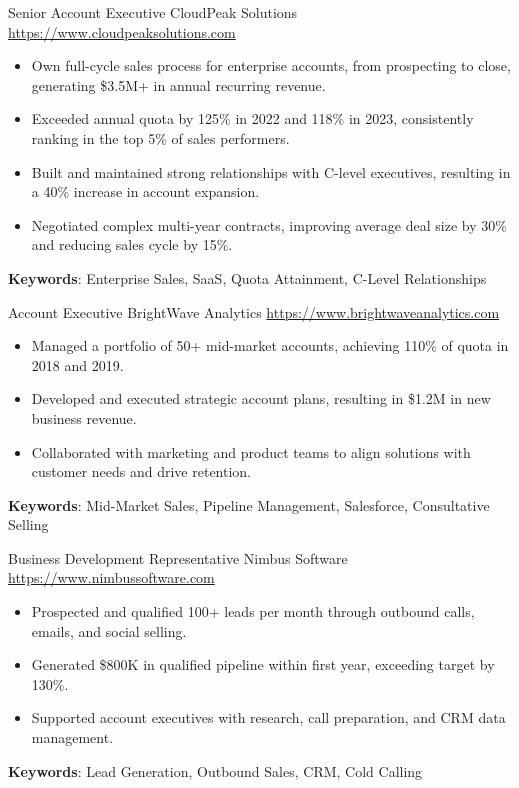 \documentclass[a4paper, serif, 10pt]{moderncv}
\begin{document}
        {Senior Account Executive}
        {CloudPeak Solutions}
        {\url{https://www.cloudpeaksolutions.com}}
        {}
        {\begin{itemize}
\item Own full-cycle sales process for enterprise accounts, from prospecting to close, generating \$3.5M+ in annual recurring revenue.
\item Exceeded annual quota by 125\% in 2022 and 118\% in 2023, consistently ranking in the top 5\% of sales performers.
\item Built and maintained strong relationships with C-level executives, resulting in a 40\% increase in account expansion.
\item Negotiated complex multi-year contracts, improving average deal size by 30\% and reducing sales cycle by 15\%.
\end{itemize}
\textbf{Keywords}: Enterprise Sales, SaaS, Quota Attainment, C-Level Relationships}

        {Account Executive}
        {BrightWave Analytics}
        {\url{https://www.brightwaveanalytics.com}}
        {}
        {\begin{itemize}
\item Managed a portfolio of 50+ mid-market accounts, achieving 110\% of quota in 2018 and 2019.
\item Developed and executed strategic account plans, resulting in \$1.2M in new business revenue.
\item Collaborated with marketing and product teams to align solutions with customer needs and drive retention.
\end{itemize}
\textbf{Keywords}: Mid-Market Sales, Pipeline Management, Salesforce, Consultative Selling}

        {Business Development Representative}
        {Nimbus Software}
        {\url{https://www.nimbussoftware.com}}
        {}
        {\begin{itemize}
\item Prospected and qualified 100+ leads per month through outbound calls, emails, and social selling.
\item Generated \$800K in qualified pipeline within first year, exceeding target by 130\%.
\item Supported account executives with research, call preparation, and CRM data management.
\end{itemize}
\textbf{Keywords}: Lead Generation, Outbound Sales, CRM, Cold Calling}
\end{document}
